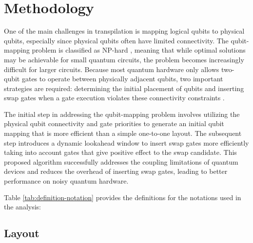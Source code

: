\chapter{Methodology} \label{Chap3} %
One of the main challenges in transpilation is mapping logical qubits to physical qubits, especially since physical qubits often have limited connectivity. The qubit-mapping problem is classified as NP-hard \cite{botea_complexity_2021}, meaning that while optimal solutions may be achievable for small quantum circuits, the problem becomes increasingly difficult for larger circuits. Because most quantum hardware only allows two-qubit gates to operate between physically adjacent qubits, two important strategies are required: determining the initial placement of qubits and inserting swap gates when a gate execution violates these connectivity constraints \cite{cowtan_qubit_2019}.

The initial step in addressing the qubit-mapping problem involves utilizing the physical qubit connectivity and gate priorities to generate an initial qubit mapping that is more efficient than a simple one-to-one layout. The subsequent step introduces a dynamic lookahead window to insert swap gates more efficiently taking into account gates that give positive effect to the swap candidate. This proposed algorithm successfully addresses the coupling limitations of quantum devices and reduces the overhead of inserting swap gates, leading to better performance on noisy quantum hardware.

Table \ref{tab:definition-notation} provides the definitions for the notations used in the analysis:


\section{Layout}
